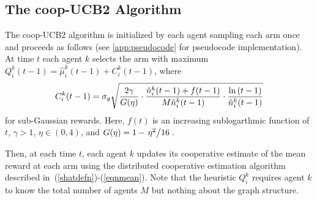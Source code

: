 \documentclass[final,5p,times,twocolumn]{elsarticle}
\theoremstyle{definition}
\newtheorem{theorem}{Theorem}
\newcommand{\slfrac}[2]{\left.#1\middle/#2\right.}
\newcommand{\lnn}[1]{%
	\ln  \left(#1\right)%
}
\newcommand\bit[1]{\textit{\textbf{#1}}}
\begin{document}
\subsection{The coop-UCB2 Algorithm}
The coop-UCB2 algorithm is initialized by each agent sampling each arm once and proceeds as follows (see \ref{app:pseudocode} for pseudocode implementation). At time $t$ each agent $k$ selects the arm with maximum $Q_i^{k}(t-1) = \hat{\mu}_i^{k}(t-1) + C_i^k(t-1)$, where
\begin{equation}
C_i^k(t-1) =  \sigma_g \; \sqrt[]{\frac{2\gamma}{G(\eta)} \cdot \frac{\hat{n}_i^{k}(t-1) +  f(t-1)}{M\hat{n}_i^{k}(t-1)}\cdot\frac{ \lnn{t-1}}{\hat{n}_i^{k}(t-1)}} \label{C2defn-bounded}
\end{equation}
for sub-Gaussian rewards.  Here, $f(t)$ is an increasing sublogarthmic function of $t$, $\gamma>1$, $\eta \in (0,4)$, and $G(\eta) = 1-\slfrac{\eta^2}{16}$. 

Then, at each time $t$, each agent $k$ updates its cooperative estimate of the mean reward at each arm using the distributed cooperative estimation algorithm described in~(\ref{shatdefn})-(\ref{eqnmean}). Note that the heuristic $Q_i^k$ requires agent $k$ to know the total number of agents $M$ but {nothing about the} %
graph structure. 


\end{document}
